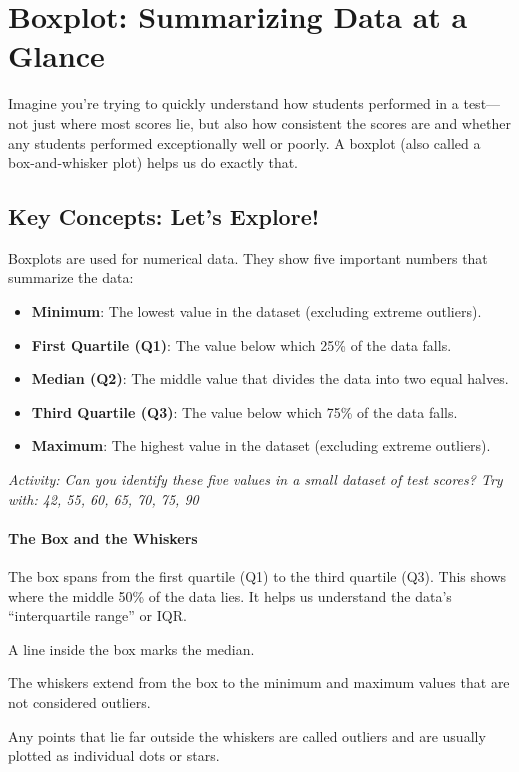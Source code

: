 \section{Boxplot: Summarizing Data at a Glance}

Imagine you’re trying to quickly understand how students performed in a test—not just where most scores lie, but also how consistent the scores are and whether any students performed exceptionally well or poorly. A boxplot (also called a box-and-whisker plot) helps us do exactly that.

\subsection*{Key Concepts: Let’s Explore!}

Boxplots are used for numerical data. They show five important numbers that summarize the data:
\begin{itemize}
  \item \textbf{Minimum}: The lowest value in the dataset (excluding extreme outliers).
  \item \textbf{First Quartile (Q1)}: The value below which 25\% of the data falls.
  \item \textbf{Median (Q2)}: The middle value that divides the data into two equal halves.
  \item \textbf{Third Quartile (Q3)}: The value below which 75\% of the data falls.
  \item \textbf{Maximum}: The highest value in the dataset (excluding extreme outliers).
\end{itemize}

\textit{Activity: Can you identify these five values in a small dataset of test scores? Try with: 42, 55, 60, 65, 70, 75, 90}

\paragraph{The Box and the Whiskers}

The box spans from the first quartile (Q1) to the third quartile (Q3). This shows where the middle 50\% of the data lies. It helps us understand the data’s “interquartile range” or IQR.

A line inside the box marks the median.

The whiskers extend from the box to the minimum and maximum values that are not considered outliers.

Any points that lie far outside the whiskers are called outliers and are usually plotted as individual dots or stars.

